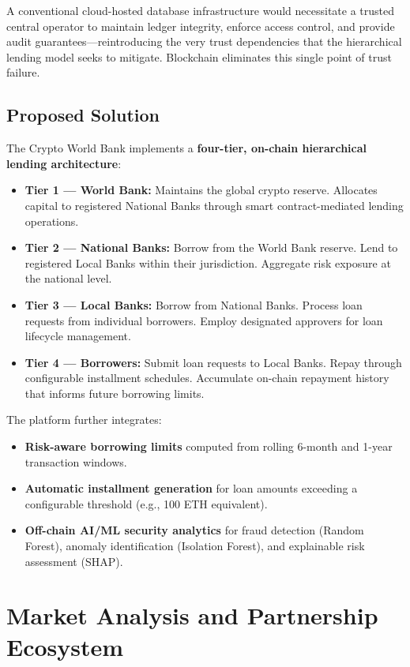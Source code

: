 \documentclass[11pt,a4paper]{article}
\begin{document}
A conventional cloud-hosted database infrastructure would necessitate a trusted central operator to maintain ledger integrity, enforce access control, and provide audit guarantees—reintroducing the very trust dependencies that the hierarchical lending model seeks to mitigate. Blockchain eliminates this single point of trust failure.

\subsection{Proposed Solution}

The Crypto World Bank implements a \textbf{four-tier, on-chain hierarchical lending architecture}:

\begin{itemize}[noitemsep]
\item \textbf{Tier 1 --- World Bank:} Maintains the global crypto reserve. Allocates capital to registered National Banks through smart contract-mediated lending operations.
\item \textbf{Tier 2 --- National Banks:} Borrow from the World Bank reserve. Lend to registered Local Banks within their jurisdiction. Aggregate risk exposure at the national level.
\item \textbf{Tier 3 --- Local Banks:} Borrow from National Banks. Process loan requests from individual borrowers. Employ designated approvers for loan lifecycle management.
\item \textbf{Tier 4 --- Borrowers:} Submit loan requests to Local Banks. Repay through configurable installment schedules. Accumulate on-chain repayment history that informs future borrowing limits.
\end{itemize}

The platform further integrates:

\begin{itemize}[noitemsep]
\item \textbf{Risk-aware borrowing limits} computed from rolling 6-month and 1-year transaction windows.
\item \textbf{Automatic installment generation} for loan amounts exceeding a configurable threshold (e.g., 100 ETH equivalent).
\item \textbf{Off-chain AI/ML security analytics} for fraud detection (Random Forest), anomaly identification (Isolation Forest), and explainable risk assessment (SHAP).
\end{itemize}

\section{Market Analysis and Partnership Ecosystem}
\end{document}
